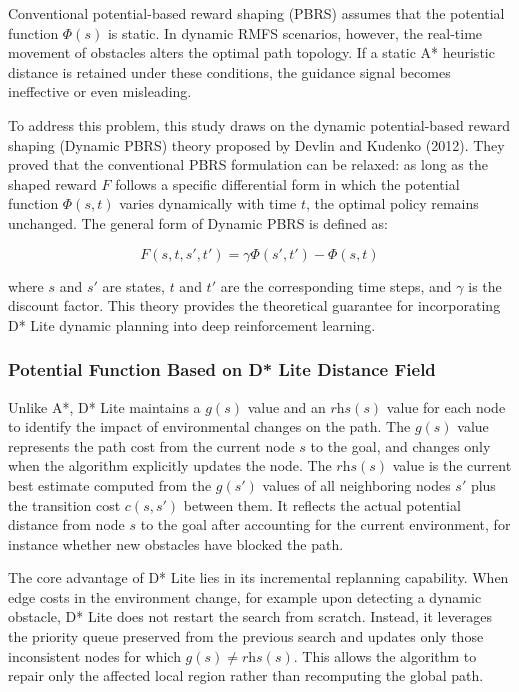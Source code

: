 Conventional potential-based reward shaping (PBRS) assumes that the potential function $\Phi(s)$ is static. In dynamic RMFS scenarios, however, the real-time movement of obstacles alters the optimal path topology. If a static A* heuristic distance is retained under these conditions, the guidance signal becomes ineffective or even misleading.

To address this problem, this study draws on the dynamic potential-based reward shaping (Dynamic PBRS) theory proposed by Devlin and Kudenko (2012). They proved that the conventional PBRS formulation can be relaxed: as long as the shaped reward $F$ follows a specific differential form in which the potential function $\Phi(s, t)$ varies dynamically with time $t$, the optimal policy remains unchanged. The general form of Dynamic PBRS is defined as:

\begin{equation}
F(s, t, s', t') = \gamma \Phi(s', t') - \Phi(s, t) \label{eq:dynamic-pbrs}
\end{equation}

where $s$ and $s'$ are states, $t$ and $t'$ are the corresponding time steps, and $\gamma$ is the discount factor. This theory provides the theoretical guarantee for incorporating D* Lite dynamic planning into deep reinforcement learning.

\subsubsection{Potential Function Based on D* Lite Distance Field}

Unlike A*, D* Lite maintains a $g(s)$ value and an $\textit{rhs}(s)$ value for each node to identify the impact of environmental changes on the path. The $g(s)$ value represents the path cost from the current node $s$ to the goal, and changes only when the algorithm explicitly updates the node. The $\textit{rhs}(s)$ value is the current best estimate computed from the $g(s')$ values of all neighboring nodes $s'$ plus the transition cost $c(s, s')$ between them. It reflects the actual potential distance from node $s$ to the goal after accounting for the current environment, for instance whether new obstacles have blocked the path.

The core advantage of D* Lite lies in its incremental replanning capability. When edge costs in the environment change, for example upon detecting a dynamic obstacle, D* Lite does not restart the search from scratch. Instead, it leverages the priority queue preserved from the previous search and updates only those inconsistent nodes for which $g(s) \neq \textit{rhs}(s)$. This allows the algorithm to repair only the affected local region rather than recomputing the global path.

